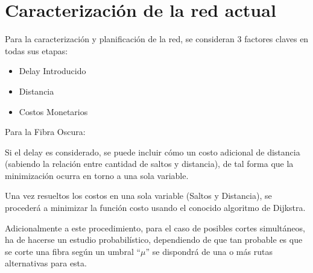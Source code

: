 \section{Caracterización de la red actual}
\label{sec:caracterizacion}

Para la caracterización y planificación de la red, se consideran 3
factores claves en todas sus etapas:

\begin{itemize}
\item Delay Introducido
\item Distancia
\item Costos Monetarios
\end{itemize}

Para la Fibra Oscura:

Si el delay es considerado, se puede incluir cómo un costo adicional
de distancia (sabiendo la relación entre cantidad de saltos y
distancia), de tal forma que la minimización ocurra en torno a una
sola variable.

Una vez resueltos los costos en una sola variable (Saltos y
Distancia), se procederá a minimizar la función costo usando el
conocido algoritmo de Dijkstra.

Adicionalmente a este procedimiento, para el caso de posibles cortes
simultáneos, ha de hacerse un estudio probabilístico, dependiendo de
que tan probable es que se corte una fibra según un umbral ``$\mu$'' se
dispondrá de una o más rutas alternativas para esta.
